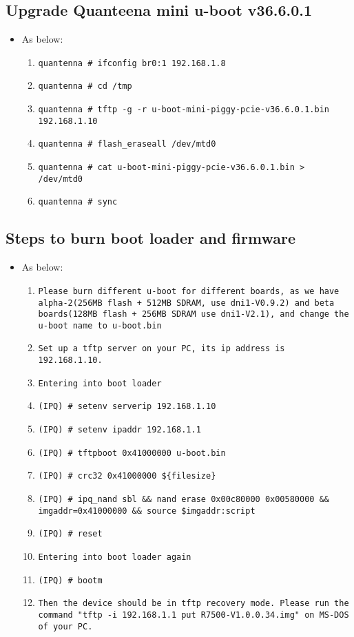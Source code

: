 \documentclass[12pt]{report}
\begin{document}
    \subsection{Upgrade Quanteena mini u-boot v36.6.0.1}
    \begin{itemize}
    \item As below:
    	\begin{enumerate}
		\item \texttt{quantenna \# ifconfig br0:1 192.168.1.8}
		\item \texttt{quantenna \# cd /tmp}
		\item \texttt{quantenna \# tftp -g -r u-boot-mini-piggy-pcie-v36.6.0.1.bin 192.168.1.10}
		\item \texttt{quantenna \# flash\_eraseall /dev/mtd0}
		\item \texttt{quantenna \# cat u-boot-mini-piggy-pcie-v36.6.0.1.bin > /dev/mtd0}
		\item \texttt{quantenna \# sync}
    	\end{enumerate}
    \end{itemize}

    \subsection{Steps to burn boot loader and firmware}
    \begin{itemize}
    \item As below:
            \begin{enumerate}
	    	\item \texttt{Please burn different u-boot for different boards, as we have alpha-2(256MB flash + 512MB SDRAM, use dni1-V0.9.2) and beta boards(128MB flash + 256MB SDRAM use dni1-V2.1), and change the u-boot name to u-boot.bin}
		\item \texttt{Set up a tftp server on your PC, its ip address is 192.168.1.10.}
		\item \texttt{Entering into boot loader}
		\item \texttt{(IPQ) \# setenv serverip 192.168.1.10}
		\item \texttt{(IPQ) \# setenv ipaddr 192.168.1.1}
		\item \texttt{(IPQ) \# tftpboot 0x41000000 u-boot.bin}
		\item \texttt{(IPQ) \# crc32 0x41000000 \$\{filesize\}}
		\item \texttt{(IPQ) \# ipq\_nand sbl \&\& nand erase 0x00c80000 0x00580000 \&\& imgaddr=0x41000000 \&\& source \$imgaddr:script}
		\item \texttt{(IPQ) \# reset}
		\item \texttt{Entering into boot loader again}
		\item \texttt{(IPQ) \# bootm}
		\item \texttt{Then the device should be in tftp recovery mode. Please run the command "tftp -i 192.168.1.1 put R7500-V1.0.0.34.img" on MS-DOS of your PC.}
            \end{enumerate}
    \end{itemize}
\end{document}
